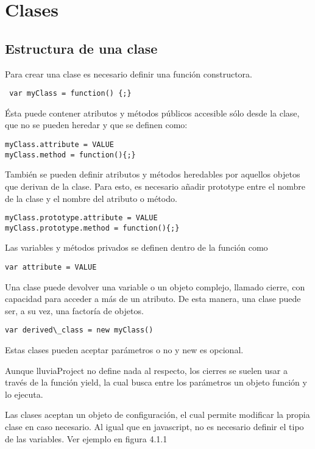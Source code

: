 \section{Clases}
\label{sec:clases}

\subsection{Estructura de una clase}
\label{subsection:estructura}

Para crear una clase es necesario definir una función constructora. 
\begin{verbatim}
 var myClass = function() {;} 
\end{verbatim}

Ésta puede contener atributos y métodos públicos accesible sólo desde la clase, que no se pueden heredar y que se definen como:
\begin{verbatim}
myClass.attribute = VALUE
myClass.method = function(){;}
\end{verbatim}

También se pueden definir atributos y métodos heredables por aquellos objetos que derivan de la clase. 
Para esto, es necesario añadir prototype entre el nombre de la clase y el nombre del atributo o método. 
\begin{verbatim}
myClass.prototype.attribute = VALUE
myClass.prototype.method = function(){;}
\end{verbatim}

Las variables y métodos privados se definen dentro de la función como
\begin{verbatim}
var attribute = VALUE
\end{verbatim}

Una clase puede devolver una variable o un objeto complejo, llamado cierre, con capacidad para acceder a más de un atributo. 
De esta manera, una clase puede ser, a su vez, una factoría de objetos.
\begin{verbatim}
var derived\_class = new myClass()
\end{verbatim}
Estas clases pueden aceptar parámetros o no y new es opcional.

Aunque lluviaProject no define nada al respecto, los cierres se suelen usar a través de la función yield, la cual busca entre los parámetros 
un objeto función y lo ejecuta.

Las clases aceptan un objeto de configuración, el cual permite modificar la propia clase en caso necesario. Al igual que en javascript, 
no es necesario definir el tipo de las variables. Ver ejemplo en figura 4.1.1

